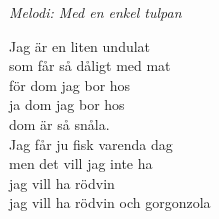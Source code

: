 {\footnotesize\textit{Melodi: Med en enkel tulpan}}\par
\vspace{10pt}
Jag är en liten undulat\\
som får så dåligt med mat\\
för dom jag bor hos\\
ja dom jag bor hos\\
dom är så snåla.\\
Jag får ju fisk varenda dag\\
men det vill jag inte ha\\
jag vill ha rödvin\\
jag vill ha rödvin och gorgonzola
